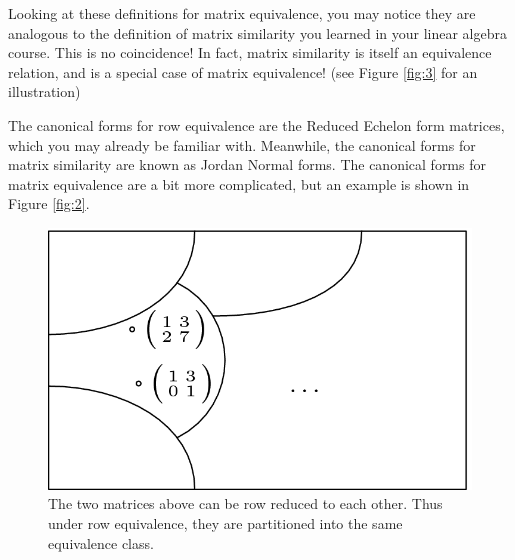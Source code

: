 \documentclass{article}
\begin{document}
        \vspace{2mm}
        Looking at these definitions for matrix equivalence, you may notice they are analogous to the definition of matrix similarity you learned in your linear algebra course. This is no coincidence! In fact, matrix similarity is itself an equivalence relation, and is a special case of matrix equivalence! (see Figure \ref*{fig:3} for an illustration)

        \vspace{3mm}
        The canonical forms for row equivalence are the Reduced Echelon form matrices, which you may already be familiar with. Meanwhile, the canonical forms for matrix similarity are known as Jordan Normal forms. The canonical forms for matrix equivalence are a bit more complicated, but an example is shown in Figure \ref*{fig:2}.
        
        \begin{figure}[H]
            \centering
            \captionsetup{width=.6\linewidth}
            \includegraphics[scale = .3]{sp23/hw-supplements/hw5-supp/images/linalg_reduced_echelon_form_equiv_classes.png}
            \caption{The two matrices above can be row reduced to each other. Thus under row equivalence, they are partitioned into the same equivalence class.}
            \label{fig:1}
        \end{figure}
\end{document}
